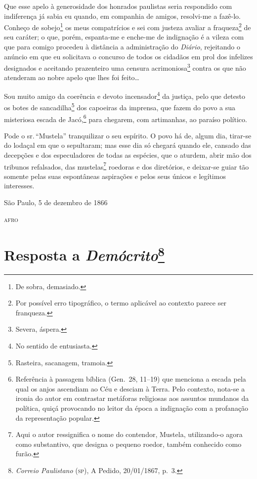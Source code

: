 Que esse apelo à generosidade dos honrados paulistas seria respondido
com indiferença já sabia eu quando, em companhia de amigos, resolvi-me a
fazê-lo. Conheço de sobejo\footnote{De sobra, demasiado.} os meus
compatrícios e sei com justeza avaliar a fraqueza\footnote{Por
  possível erro tipográfico, o termo aplicável ao contexto parece ser
  franqueza.} de seu caráter; o que, porém, espanta-me e enche-me de
indignação é a vileza com que para comigo procedeu à distância a
administração do \emph{Diário}, rejeitando o anúncio em que eu
solicitava o concurso de todos os cidadãos em prol dos infelizes
designados e aceitando prazenteiro uma censura acrimoniosa\footnote{
  Severa, áspera.} contra os que não atenderam ao nobre apelo que lhes
foi feito\ldots{}

Sou muito amigo da coerência e devoto incensador\footnote{No sentido
  de entusiasta.} da justiça, pelo que detesto os botes de
sancadilha\footnote{Rasteira, sacanagem, tramoia.} dos capoeiras da
imprensa, que fazem do povo a sua misteriosa escada de Jacó,\footnote{
  Referência à passagem bíblica (Gen.~28, 11--19) que menciona a escada
  pela qual os anjos ascendiam ao Céu e desciam à Terra. Pelo contexto,
  nota-se a ironia do autor em contrastar metáforas religiosas aos
  assuntos mundanos da política, quiçá provocando no leitor da época a
  indignação com a profanação da representação popular.} para chegarem,
com artimanhas, ao paraíso político.

Pode o sr.\,``Mustela'' tranquilizar o seu espírito. O povo há de, algum
dia, tirar-se do lodaçal em que o sepultaram; mas esse dia só chegará
quando ele, cansado das decepções e dos especuladores de todas as
espécies, que o aturdem, abrir mão dos tribunos refalsados, das
mustelas\footnote{Aqui o autor ressignifica o nome do contendor,
  Mustela, utilizando-o agora como substantivo, que designa o pequeno
  roedor, também conhecido como furão.} roedoras e dos diretórios, e
deixar-se guiar tão somente pelas suas espontâneas aspirações e pelos
seus únicos e legítimos interesses.

\begin{flushright}
São Paulo, 5 de dezembro de 1866

\textsc{afro}
\end{flushright}

\chapter{Resposta a \emph{Demócrito}\footnote{\emph{Correio
  Paulistano} (\textsc{sp}), A Pedido, 20/01/1867, p.~3.}}

